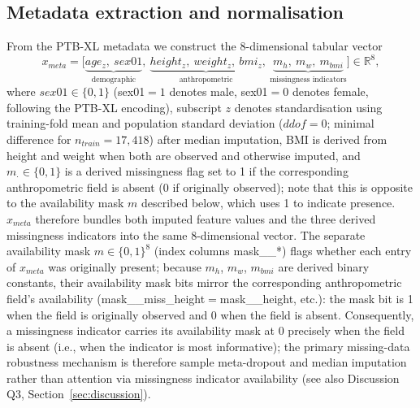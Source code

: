 \documentclass[mathematics,article,submit,pdftex]{Definitions/mdpi}
\def\texttt#1{#1}%
\def\mathrm#1{#1}%
\def\mathbf#1{#1}%
\def\emph#1{#1}%
\begin{document}
\subsection{Metadata extraction and normalisation}
From the PTB-XL metadata we construct the 8-dimensional tabular vector
\begin{equation}\label{eq:xmeta}
\mathbf{x}_{\mathrm{meta}}
= \bigl[\underbrace{\mathrm{age}_z,\ \mathrm{sex01}}_{\text{demographic}},\
         \underbrace{\mathrm{height}_z,\ \mathrm{weight}_z,\ \mathrm{bmi}_z}_{\text{anthropometric}},\
         \underbrace{m_h,\ m_w,\ m_{\mathrm{bmi}}}_{\text{missingness indicators}}\bigr]
\in \mathbb{R}^{8},
\end{equation}
where $\mathrm{sex01}\in\{0,1\}$ (sex01$=1$ denotes male, sex01$=0$ denotes female, following the PTB-XL encoding), subscript $z$ denotes standardisation using training-fold mean and population standard deviation ($\mathrm{ddof}{=}0$; minimal difference for $n_{\mathrm{train}}{=}17{,}418$) after median imputation, BMI is derived from height and weight when both are observed and otherwise imputed, and $m_{\cdot}\in\{0,1\}$ is a derived missingness flag set to 1 if the corresponding anthropometric field is absent (0 if originally observed); note that this is opposite to the availability mask $\mathbf{m}$ described below, which uses 1 to indicate presence. $\mathbf{x}_{\mathrm{meta}}$ therefore bundles both imputed feature values \emph{and} the three derived missingness indicators into the same 8-dimensional vector. The separate availability mask $\mathbf{m}\in\{0,1\}^{8}$ (index columns \texttt{mask\_\_*}) flags whether each entry of $\mathbf{x}_{\mathrm{meta}}$ was originally present; because $m_h$, $m_w$, $m_{\mathrm{bmi}}$ are derived binary constants, their availability mask bits mirror the corresponding anthropometric field's availability (\texttt{mask\_\_miss\_height}$=$\texttt{mask\_\_height}, etc.): the mask bit is 1 when the field is originally observed and 0 when the field is absent. Consequently, a missingness indicator carries its availability mask at 0 precisely when the field is absent (i.e., when the indicator is most informative); the primary missing-data robustness mechanism is therefore sample meta-dropout and median imputation rather than attention via missingness indicator availability (see also Discussion Q3, Section~\ref{sec:discussion}).
\end{document}
